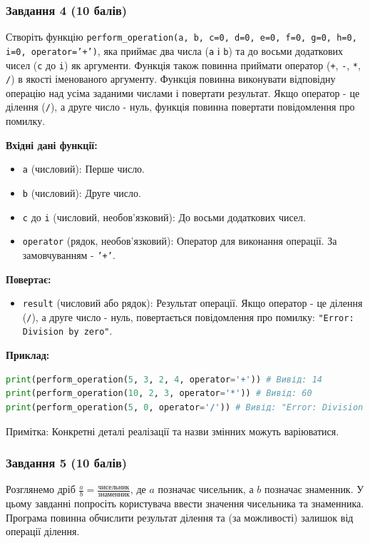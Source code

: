 \documentclass[12pt]{article}
\begin{document}
\subsubsection{Завдання 4 (10 балів)}
Створіть функцію \texttt{perform\_operation(a, b, c=0, d=0, e=0, f=0, g=0, h=0, i=0, operator='+')}, яка приймає два числа (\texttt{a} і \texttt{b}) та до восьми додаткових чисел (\texttt{c} до \texttt{i}) як аргументи. Функція також повинна приймати оператор (\texttt{+}, \texttt{-}, \texttt{*}, \texttt{/}) в якості іменованого аргументу. Функція повинна виконувати відповідну операцію над усіма заданими числами і повертати результат. Якщо оператор - це ділення (\texttt{/}), а друге число - нуль, функція повинна повертати повідомлення про помилку.

\textbf{Вхідні дані функції:}
\begin{itemize}
\item \texttt{a} (числовий): Перше число.
\item \texttt{b} (числовий): Друге число.
\item \texttt{c} до \texttt{i} (числовий, необов'язковий): До восьми додаткових чисел.
\item \texttt{operator} (рядок, необов'язковий): Оператор для виконання операції. За замовчуванням - \texttt{'+'}.
\end{itemize}

\textbf{Повертає:}
\begin{itemize}
\item \texttt{result} (числовий або рядок): Результат операції. Якщо оператор - це ділення (\texttt{/}), а друге число - нуль, повертається повідомлення про помилку: \texttt{"Error: Division by zero"}.
\end{itemize}

\textbf{Приклад:}
\begin{lstlisting}[language=Python]
print(perform_operation(5, 3, 2, 4, operator='+')) # Вивід: 14
print(perform_operation(10, 2, 3, operator='*')) # Вивід: 60
print(perform_operation(5, 0, operator='/')) # Вивід: "Error: Division by zero"
\end{lstlisting}

Примітка: Конкретні деталі реалізації та назви змінних можуть варіюватися.

\subsubsection{Завдання 5 (10 балів)}
Розглянемо дріб $\frac{a}{b} = \frac{чисельник}{знаменник}$, де $a$ позначає чисельник, а $b$ позначає знаменник. У цьому завданні попросіть користувача ввести значення чисельника та знаменника. Програма повинна обчислити результат ділення та (за можливості) залишок від операції ділення.
\end{document}
